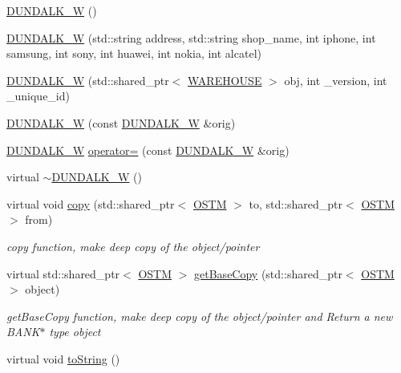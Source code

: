 \begin{DoxyCompactItemize}
\item 
\hyperlink{class_d_u_n_d_a_l_k___w_ad459a77b4f3e0aaebb3d178eb014a77f}{D\+U\+N\+D\+A\+L\+K\+\_\+W} ()
\item 
\hyperlink{class_d_u_n_d_a_l_k___w_ae295e04552eafc722b97900f97962fe8}{D\+U\+N\+D\+A\+L\+K\+\_\+W} (std\+::string address, std\+::string shop\+\_\+name, int iphone, int samsung, int sony, int huawei, int nokia, int alcatel)
\item 
\hyperlink{class_d_u_n_d_a_l_k___w_a12eb6e2b3a96d00049f55a693c63e64d}{D\+U\+N\+D\+A\+L\+K\+\_\+W} (std\+::shared\+\_\+ptr$<$ \hyperlink{class_w_a_r_e_h_o_u_s_e}{W\+A\+R\+E\+H\+O\+U\+SE} $>$ obj, int \+\_\+version, int \+\_\+unique\+\_\+id)
\item 
\hyperlink{class_d_u_n_d_a_l_k___w_a0ee6950b4b6cb12b73595e805be8ba64}{D\+U\+N\+D\+A\+L\+K\+\_\+W} (const \hyperlink{class_d_u_n_d_a_l_k___w}{D\+U\+N\+D\+A\+L\+K\+\_\+W} \&orig)
\item 
\hyperlink{class_d_u_n_d_a_l_k___w}{D\+U\+N\+D\+A\+L\+K\+\_\+W} \hyperlink{class_d_u_n_d_a_l_k___w_a63e33d9aa73d944f92928e90566874b9}{operator=} (const \hyperlink{class_d_u_n_d_a_l_k___w}{D\+U\+N\+D\+A\+L\+K\+\_\+W} \&orig)
\item 
virtual \hyperlink{class_d_u_n_d_a_l_k___w_a91d26f413bf5bc2d089b77036f7fbfa9}{$\sim$\+D\+U\+N\+D\+A\+L\+K\+\_\+W} ()
\item 
virtual void \hyperlink{class_d_u_n_d_a_l_k___w_a850117e656ee2961317f758e70e5d143}{copy} (std\+::shared\+\_\+ptr$<$ \hyperlink{class_o_s_t_m}{O\+S\+TM} $>$ to, std\+::shared\+\_\+ptr$<$ \hyperlink{class_o_s_t_m}{O\+S\+TM} $>$ from)
\begin{DoxyCompactList}\small\item\em copy function, make deep copy of the object/pointer \end{DoxyCompactList}\item 
virtual std\+::shared\+\_\+ptr$<$ \hyperlink{class_o_s_t_m}{O\+S\+TM} $>$ \hyperlink{class_d_u_n_d_a_l_k___w_a06cbcac20829906b710962967795d4e6}{get\+Base\+Copy} (std\+::shared\+\_\+ptr$<$ \hyperlink{class_o_s_t_m}{O\+S\+TM} $>$ object)
\begin{DoxyCompactList}\small\item\em get\+Base\+Copy function, make deep copy of the object/pointer and Return a new B\+A\+N\+K$\ast$ type object \end{DoxyCompactList}\item 
virtual void \hyperlink{class_d_u_n_d_a_l_k___w_aef2a8301835c60c21f9f3199259fed87}{to\+String} ()

\end{DoxyCompactItemize}
